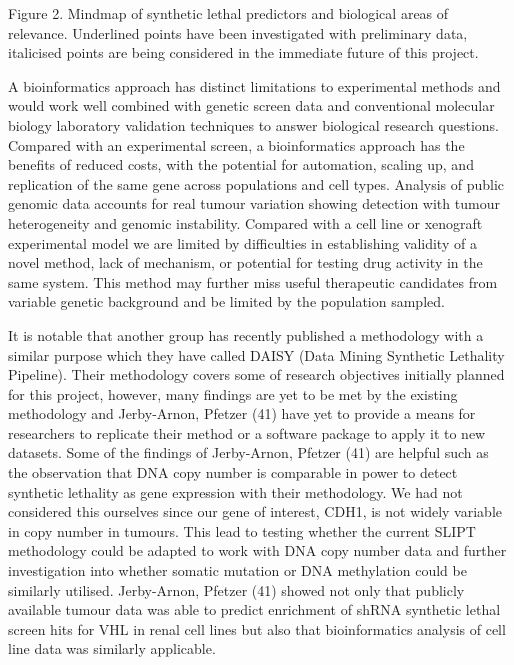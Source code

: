 Figure 2. Mindmap of synthetic lethal predictors and biological areas of relevance. Underlined points have been investigated with preliminary data, italicised points are being considered in the immediate future of this project.

A bioinformatics approach has distinct limitations to experimental methods and would work well combined with genetic screen data and conventional molecular biology laboratory validation techniques to answer biological research questions. Compared with an experimental screen, a bioinformatics approach has the benefits of reduced costs, with the potential for automation, scaling up, and replication of the same gene across populations and cell types. Analysis of public genomic data accounts for real tumour variation showing detection with tumour heterogeneity and genomic instability. Compared with a cell line or xenograft experimental model we are limited by difficulties in establishing validity of a novel method, lack of mechanism, or potential for testing drug activity in the same system. This method may further miss useful therapeutic candidates from variable genetic background and be limited by the population sampled.

It is notable that another group has recently published a methodology with a similar purpose which they have called DAISY (Data Mining Synthetic Lethality Pipeline). Their methodology covers some of research objectives initially planned for this project, however, many findings are yet to be met by the existing methodology and Jerby-Arnon, Pfetzer (41) have yet to provide a means for researchers to replicate their method or a software package to apply it to new datasets. Some of the findings of Jerby-Arnon, Pfetzer (41) are helpful such as the observation that DNA copy number is comparable in power to detect synthetic lethality as gene expression with their methodology. We had not considered this ourselves since our gene of interest, CDH1, is not widely variable in copy number in tumours. This lead to testing whether the current SLIPT methodology could be adapted to work with DNA copy number data and further investigation into whether somatic mutation or DNA methylation could be similarly utilised. Jerby-Arnon, Pfetzer (41) showed not only that publicly available tumour data was able to predict enrichment of shRNA synthetic lethal screen hits for VHL in renal cell lines but also that bioinformatics analysis of cell line data was similarly applicable.

